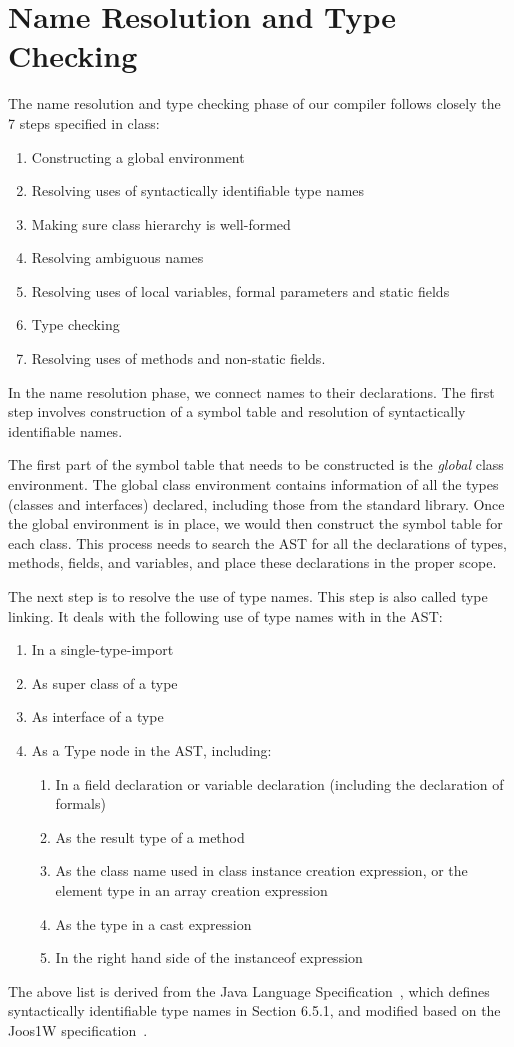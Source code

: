 \documentclass[a4paper, notitlepage]{report}
\begin{document}
\section{Name Resolution and Type Checking}
\label{design_name}
The name resolution and type checking phase of our compiler follows closely the 7 steps specified in class:
\begin{enumerate}
	\item Constructing a global environment
	\item Resolving uses of syntactically identifiable type names
	\item Making sure class hierarchy is well-formed
	\item Resolving ambiguous names
	\item Resolving uses of local variables, formal parameters and static fields
	\item Type checking
	\item Resolving uses of methods and non-static fields.
\end{enumerate}

In the name resolution phase, we connect names to their declarations. The first step involves construction of a symbol table and resolution of syntactically identifiable names.

The first part of the symbol table that needs to be constructed is the \emph{global} class environment. The global class environment contains information of all the types (classes and interfaces) declared, including those from the standard library. Once the global environment is in place, we would then construct the symbol table for each class. This process needs to search the AST for all the declarations of types, methods, fields, and variables, and place these declarations in the proper scope.

The next step is to resolve the use of type names. This step is also called type linking. It deals with the following use of type names with in the AST:
\begin{enumerate}
\item In a single-type-import
\item As super class of a type
\item As interface of a type
\item As a Type node in the AST, including:
	\begin{enumerate}
	\item In a field declaration or variable declaration (including the declaration of formals)
	\item As the result type of a method
	\item As the class name used in class instance creation expression, or the element type in an array creation expression
	\item As the type in a cast expression
	\item In the right hand side of the instanceof expression
	\end{enumerate}
\end{enumerate}
The above list is derived from the Java Language Specification~\cite{gosling2000java}, which defines syntactically identifiable type names in Section 6.5.1, and modified based on the Joos1W specification~\cite{joos1w}. 
\end{document}
